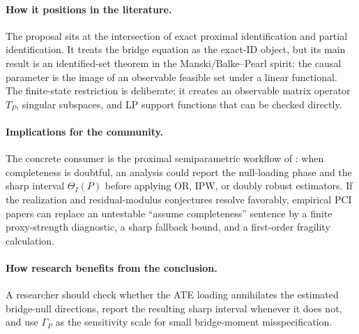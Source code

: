 \documentclass[11pt]{article}
\theoremstyle{definition}
\theoremstyle{plain}
\theoremstyle{remark}
\begin{document}
\paragraph{How it positions in the literature.}
The proposal sits at the intersection of exact proximal identification and
partial identification.  It treats the bridge equation as the exact-ID
object, but its main result is an identified-set theorem in the
Manski/Balke--Pearl spirit: the causal parameter is the image of an observable
feasible set under a linear functional.  The finite-state restriction is
deliberate; it creates an observable matrix operator \(T_P\), singular
subspaces, and LP support functions that can be checked directly.

\paragraph{Implications for the community.}
The concrete consumer is the proximal semiparametric workflow of
\citet{CuiPuShiMiaoTchetgen2024JASA}: when completeness is doubtful, an
analysis could report the null-loading phase and the sharp interval
\(\Theta_I(P)\) before applying OR, IPW, or doubly robust estimators.  If the
realization and residual-modulus conjectures resolve favorably, empirical PCI
papers can replace an untestable ``assume completeness'' sentence by a finite
proxy-strength diagnostic, a sharp fallback bound, and a first-order
fragility calculation.

\paragraph{How research benefits from the conclusion.}
A researcher should check whether the ATE loading annihilates the estimated
bridge-null directions, report the resulting sharp interval whenever it does
not, and use \(\Gamma_P\) as the sensitivity scale for small bridge-moment
misspecification.
\end{document}
